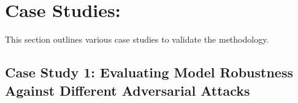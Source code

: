 \documentclass[10pt, conference, a4paper, final]{IEEEtran}
\begin{document}
    





\section{Case Studies:}

This section outlines various case studies to validate the methodology.

\subsection{Case Study 1: Evaluating Model Robustness Against Different Adversarial Attacks}
\end{document}
